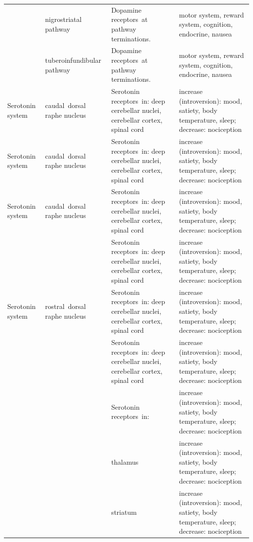 \begin{longtable}[t]{>{\raggedright\arraybackslash}p{5em}>{\raggedright\arraybackslash}p{15em}>{\raggedright\arraybackslash}p{10em}>{\raggedright\arraybackslash}p{15em}}
\rowcolor{gray!6}   & nigrostriatal pathway & Dopamine receptors at pathway terminations. & motor system, reward system, cognition, endocrine, nausea\\

\multirow{-5}{5em}{\raggedright\arraybackslash Dopamine system} & tuberoinfundibular pathway & Dopamine receptors at pathway terminations. & motor system, reward system, cognition, endocrine, nausea\\
\cmidrule{1-4}
\rowcolor{gray!6}  Serotonin system & caudal dorsal raphe nucleus & Serotonin receptors in: deep cerebellar nuclei, cerebellar cortex, spinal cord & increase (introversion): mood, satiety, body temperature, sleep;  decrease: \vphantom{3} nociception\\
Serotonin system & caudal dorsal raphe nucleus & Serotonin receptors in: deep cerebellar nuclei, cerebellar cortex, spinal cord & increase (introversion): mood, satiety, body temperature, sleep;  decrease: \vphantom{2} nociception\\
\rowcolor{gray!6}  Serotonin system & caudal dorsal raphe nucleus & Serotonin receptors in: deep cerebellar nuclei, cerebellar cortex, spinal cord & increase (introversion): mood, satiety, body temperature, sleep;  decrease: \vphantom{1} nociception\\
 &  & Serotonin receptors in: deep cerebellar nuclei, cerebellar cortex, spinal cord & increase (introversion): mood, satiety, body temperature, sleep;  decrease: nociception\\

\rowcolor{gray!6}  Serotonin system & rostral dorsal raphe nucleus & Serotonin receptors in: deep cerebellar nuclei, cerebellar cortex, spinal cord & increase (introversion): mood, satiety, body temperature, sleep;  decrease: \vphantom{1} nociception\\
 &  & Serotonin receptors in: deep cerebellar nuclei, cerebellar cortex, spinal cord & increase (introversion): mood, satiety, body temperature, sleep;  decrease: nociception\\

\rowcolor{gray!6}   &  & Serotonin receptors in: & increase (introversion): mood, satiety, body temperature, sleep;  decrease: nociception\\

 &  & thalamus & increase (introversion): mood, satiety, body temperature, sleep;  decrease: nociception\\

\rowcolor{gray!6}   &  & striatum & increase (introversion): mood, satiety, body temperature, sleep;  decrease: nociception\\


\end{longtable}
